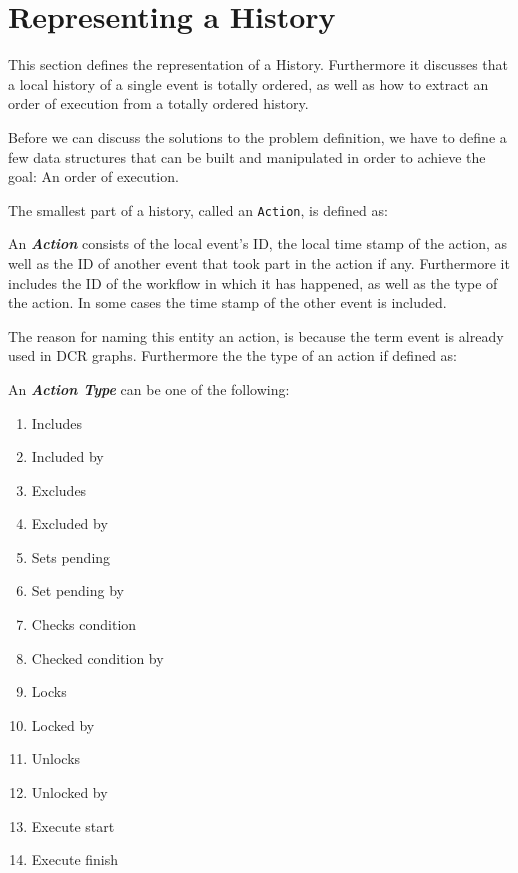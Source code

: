 \chapter{Representing a History}\label{chap:representing-a-history}
	This section defines the representation of a History. Furthermore it discusses that a local history of a single event is totally ordered, as well as how to extract an order of execution from a totally ordered history.

	\newpar Before we can discuss the solutions to the problem definition, we have to define a few data structures that can be built and manipulated in order to achieve the goal: An order of execution.
	
	\newpar The smallest part of a history, called an \texttt{Action}, is defined as:
	
	\begin{definition}
		An \textit{\textbf{Action}} consists of the local event's ID, the local time stamp of the action, as well as the ID of another event that took part in the action if any. Furthermore it includes the ID of the workflow in which it has happened, as well as the type of the action. In some cases the time stamp of the other event is included.
	\end{definition}
	
	\noindent The reason for naming this entity an action, is because the term event is already used in DCR graphs. Furthermore the the type of an action if defined as:
	
	\begin{definition}
		An \textit{\textbf{Action Type}} can be one of the following:
		\begin{multicols}{3}
			\begin{enumerate}
				\item Includes
				\item Included by
				\item Excludes
				\item Excluded by
				\item Sets pending
				\item Set pending by
				\item Checks condition
				\item Checked condition by
				\item Locks
				\item Locked by
				\item Unlocks
				\item Unlocked by
				\item Execute start
				\item Execute finish
			\end{enumerate}
		\end{multicols}
	\end{definition}
	
